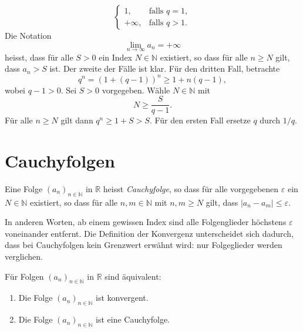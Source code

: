 \documentclass[../main.tex]{subfiles}
\begin{document}
\begin{examples}
\begin{enumerate}[(1)]
\[\begin{cases}
		    1, & \text{falls } q = 1, \\
		    +\infty, & \text{falls } q > 1.
	    \end{cases}
	  \]
	Die Notation
	\[
	  \lim_{n \to \infty} a_n = + \infty
	\]
	heisst, dass für alle $S > 0$ ein Index $N \in \mathbb{N}$
	existiert, so dass für alle $n \geq N$ gilt, dass
	$a_n > S$ ist.
	Der zweite der Fälle ist klar. Für den dritten Fall, 
	betrachte
	\[
		q^n = {\left( 1 + (q-1) \right)}^n \geq 1 + n(q-1),
	\]
	wobei $q-1 > 0$. 
	Sei $S > 0$ vorgegeben. Wähle $N \in \mathbb{N}$ mit
	\[
	  N \geq \frac{S}{q-1}.
	\]
	Für alle $n \geq N$ gilt dann $q^n \geq 1 + S > S$.
	Für den ersten Fall ersetze $q$ durch $1/q$.
\end{enumerate}
\end{examples}

\section{Cauchyfolgen}
\begin{definition}
Eine Folge 
${\left( a_n \right)}_{n \in \mathbb{N}}$ in $\mathbb{R}$ 
heisst \emph{Cauchyfolge}, so dass für alle
vorgegebenen $\varepsilon$ ein $N \in \mathbb{N}$ existiert,
so dass für alle $n, m \in \mathbb{N}$ mit $n,m \geq N$ gilt,
dass $|a_n - a_m| \leq \varepsilon$.
\end{definition}

In anderen Worten, ab einem gewissen Index sind alle
Folgenglieder höchstens $\varepsilon$ voneinander 
entfernt. Die Definition der Konvergenz unterscheidet
sich dadurch, dass bei Cauchyfolgen kein Grenzwert
erwähnt wird: nur Folgeglieder werden verglichen.

\begin{theorem}
Für Folgen ${\left( a_n \right)}_{n \in \mathbb{N}}$ in $\mathbb{R}$
  sind äquivalent:
  \begin{enumerate}[\normalfont(i)]
    \item Die Folge ${\left( a_n \right)}_{n \in \mathbb{N}}$
      ist konvergent.
    \item Die Folge ${\left( a_n \right)}_{n \in \mathbb{N}}$
      ist eine Cauchyfolge.
  \end{enumerate}
\end{theorem}
\end{document}
